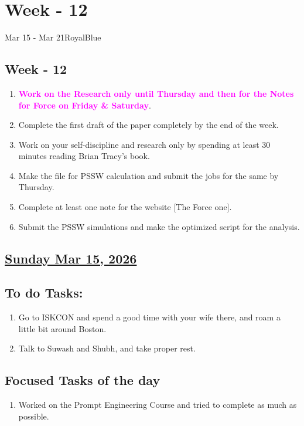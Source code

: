 \section{Week - 12}
\begin{physicsmodule}{Mar 15 - Mar 21}{RoyalBlue}
  \begin{lawbox}
    \subsection*{\sffamily\bfseries Week - 12}
    \begin{enumerate}
    \item \textcolor{magenta}{\textbf{Work on the Research only until Thursday and then for the Notes for Force on Friday \& Saturday}}.
    \item Complete the first draft of the paper completely by the end of the week.
    \item Work on your self-discipline and research only by spending at least 30 minutes reading Brian Tracy's book.
    \item Make the file for PSSW calculation and submit the jobs for the same by Thursday.
    \item Complete at least one note for the website [The Force one].
    \item Submit the PSSW simulations and make the optimized script for the analysis.
\end{enumerate}
  \end{lawbox}
\end{physicsmodule}
\subsection*{\underline{Sunday Mar 15, 2026}}
\subsection*{To do Tasks:}
\begin{enumerate}
    \item Go to ISKCON and spend a good time with your wife there, and roam a little bit around Boston. \cmark 
    \item Talk to Suwash and Shubh, and take proper rest. \cmark
\end{enumerate}
\subsection*{Focused Tasks of the day}
\begin{enumerate}[\ding{212}]  
    \item Worked on the Prompt Engineering Course and tried to complete as much as possible.
\end{enumerate}
